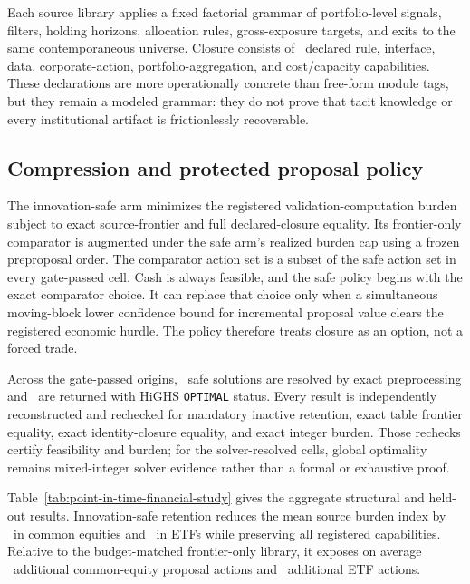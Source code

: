 Each source library applies a fixed factorial grammar of portfolio-level
signals, filters, holding horizons, allocation rules, gross-exposure targets,
and exits to the same contemporaneous universe. Closure consists of
\AORPointInTimeCapabilities\ declared rule, interface, data, corporate-action,
portfolio-aggregation, and cost/capacity capabilities. These declarations are
more operationally concrete than free-form module tags, but they remain a
modeled grammar: they do not prove that tacit knowledge or every institutional
artifact is frictionlessly recoverable.

\subsection{Compression and protected proposal policy}

The innovation-safe arm minimizes the registered validation-computation burden
subject to exact source-frontier and full declared-closure equality. Its
frontier-only comparator is augmented under the safe arm's realized burden cap
using a frozen preproposal order. The comparator action set is a subset of the
safe action set in every gate-passed cell. Cash is always feasible, and the
safe policy begins with the exact comparator choice. It can replace that choice
only when a simultaneous moving-block lower confidence bound for incremental
proposal value clears the registered economic hurdle. The policy therefore
treats closure as an option, not a forced trade.

Across the gate-passed origins, \AORPointInTimePreprocessingSolutions\ safe
solutions are resolved by exact preprocessing and
\AORPointInTimeSolverSolutions\ are returned with HiGHS
\texttt{OPTIMAL} status. Every result is independently reconstructed and
rechecked for mandatory inactive retention, exact table frontier equality,
exact identity-closure equality, and exact integer burden. Those rechecks
certify feasibility and burden; for the solver-resolved cells, global
optimality remains mixed-integer solver evidence rather than a formal or
exhaustive proof.

Table~\ref{tab:point-in-time-financial-study} gives the aggregate structural
and held-out results. Innovation-safe retention reduces the mean source burden
index by \AORPointInTimeEquityBurdenReduction\ in common equities and
\AORPointInTimeETFBurdenReduction\ in ETFs while preserving all registered
capabilities. Relative to the budget-matched frontier-only library, it exposes
on average \AORPointInTimeEquityAddedOptions\ additional common-equity proposal
actions and \AORPointInTimeETFAddedOptions\ additional ETF actions.

